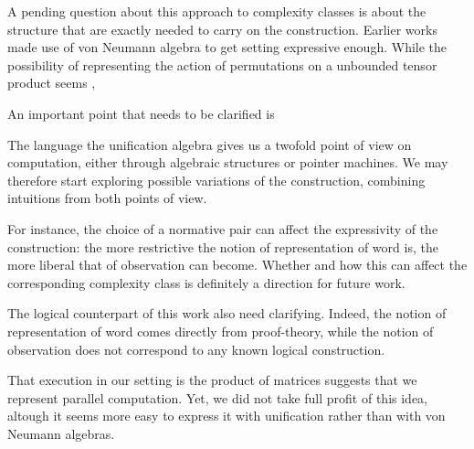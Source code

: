 A pending question about this approach to complexity classes is about the structure that are exactly needed to carry on the construction. 
Earlier works made use of von Neumann algebra to get setting expressive enough. 
While the possibility of representing the action of permutations on a unbounded tensor product seems ,

\smallskip

An important point that needs to be clarified is 










\smallskip
The language the unification algebra gives us a twofold point of view on computation, either through algebraic structures or pointer machines.
We may therefore start exploring possible variations of the construction, combining intuitions from both points of view.


\smallskip
For instance, the choice of a normative pair can affect the expressivity of the construction:
the more restrictive the notion of representation of word is, the more liberal that of observation can become.
Whether and how this can affect the corresponding complexity class is definitely a direction for future work.

\smallskip
The logical counterpart of this work also need clarifying.
Indeed, the notion of representation of word comes directly from proof-theory, while the notion of observation does not correspond to any known logical construction.

\smallskip
That execution in our setting is the product of matrices suggests that we represent parallel computation.
Yet, we did not take full profit of this idea, altough it seems more easy to express it with unification rather than with von Neumann algebras.